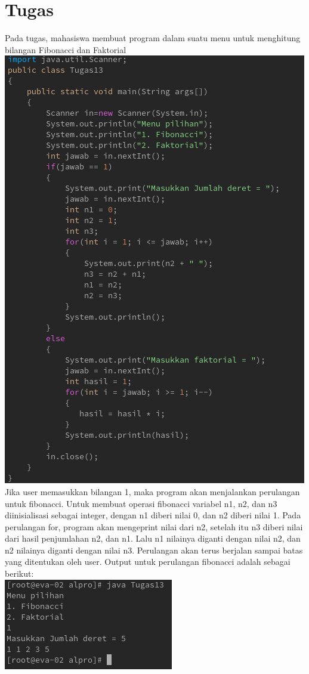 \documentclass[a4paper,12pt]{article}
\begin{document}
\newpage

\section{Tugas}
Pada tugas, mahasiswa membuat program dalam suatu menu untuk menghitung bilangan Fibonacci dan Faktorial\\
\includegraphics[width=0.8\linewidth]{tugas1.png}\\
Jika user memasukkan bilangan 1, maka program akan menjalankan perulangan untuk fibonacci. Untuk membuat operasi fibonacci variabel n1, n2, dan n3 diinisialisasi sebagai integer, dengan n1 diberi nilai 0, dan n2 diberi nilai 1. Pada perulangan for, program akan mengeprint nilai dari n2, setelah itu n3 diberi nilai dari hasil penjumlahan n2, dan n1. Lalu n1 nilainya diganti dengan nilai n2, dan n2 nilainya diganti dengan nilai n3. Perulangan akan terus berjalan sampai batas yang
ditentukan oleh user. Output untuk perulangan fibonacci adalah sebagai berikut:\\
\includegraphics[scale=.8]{tugas2.png}\\
\end{document}
